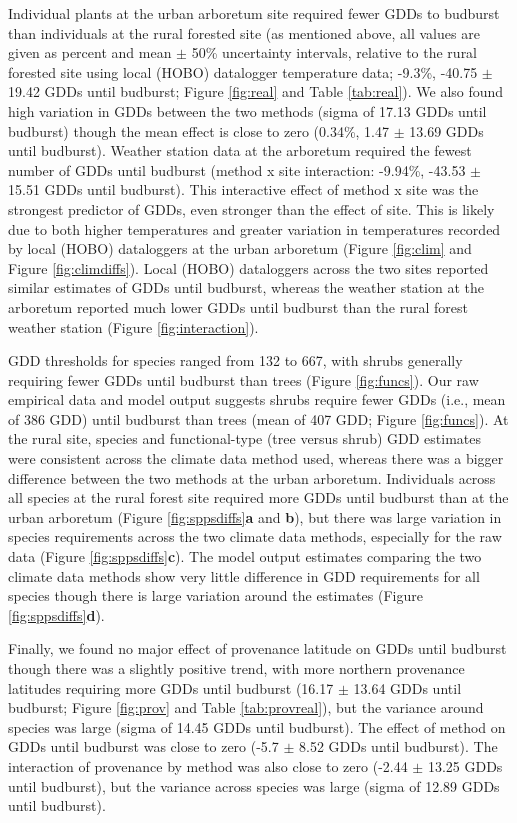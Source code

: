 \documentclass{article}\usepackage[]{graphicx}\usepackage[]{color}
\begin{document}
Individual plants at the urban arboretum site required fewer GDDs to budburst than individuals at the rural forested site (as mentioned above, all values are given as percent and mean $\pm$ 50\% uncertainty intervals, relative to the rural forested site using local (HOBO) datalogger temperature data; -9.3\%, -40.75 $\pm$ 19.42 GDDs until budburst; Figure \ref{fig:real} and Table \ref{tab:real}). We also found high variation in GDDs between the two methods (sigma of 17.13 GDDs until budburst) though the mean effect is close to zero (0.34\%, 1.47 $\pm$ 13.69 GDDs until budburst). Weather station data at the arboretum required the fewest number of GDDs until budburst (method x site interaction: -9.94\%, -43.53 $\pm$ 15.51 GDDs until budburst). This interactive effect of method x site was the strongest predictor of GDDs, even stronger than the effect of site. This is likely due to both higher temperatures and greater variation in temperatures recorded by local (HOBO) dataloggers at the urban arboretum (Figure \ref{fig:clim} and Figure \ref{fig:climdiffs}). Local (HOBO) dataloggers across the two sites reported similar estimates of GDDs until budburst, whereas the weather station at the arboretum reported much lower GDDs until budburst than the rural forest weather station (Figure \ref{fig:interaction}).

GDD thresholds for species ranged from 132 to 667, with shrubs generally requiring fewer GDDs until budburst than trees (Figure \ref{fig:funcs}). Our raw empirical data and model output suggests shrubs require fewer GDDs (i.e., mean of 386 GDD) until budburst than trees (mean of 407 GDD; Figure \ref{fig:funcs}). At the rural site, species and functional-type (tree versus shrub) GDD estimates were consistent across the climate data method used, whereas there was a bigger difference between the two methods at the urban arboretum. Individuals across all species at the rural forest site required more GDDs until budburst than at the urban arboretum (Figure \ref{fig:sppsdiffs}\textbf{a} and \textbf{b}), but there was large variation in species requirements across the two climate data methods, especially for the raw data (Figure \ref{fig:sppsdiffs}\textbf{c}). The model output estimates comparing the two climate data methods show very little difference in GDD requirements for all species though there is large variation around the estimates (Figure \ref{fig:sppsdiffs}\textbf{d}). 

Finally, we found no major effect of provenance latitude on GDDs until budburst though there was a slightly positive trend, with more northern provenance latitudes requiring more GDDs until budburst (16.17 $\pm$ 13.64 GDDs until budburst; Figure \ref{fig:prov} and Table \ref{tab:provreal}), but the variance around species was large (sigma of 14.45 GDDs until budburst). The effect of method on GDDs until budburst was close to zero (-5.7 $\pm$ 8.52 GDDs until budburst). The interaction of provenance by method was also close to zero (-2.44 $\pm$ 13.25 GDDs until budburst), but the variance across species was large (sigma of 12.89 GDDs until budburst).
\end{document}
